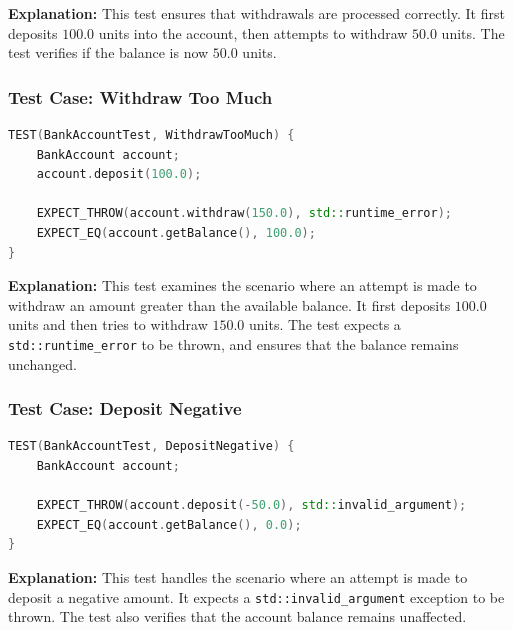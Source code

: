\textbf{Explanation:} This test ensures that withdrawals are processed correctly. It first deposits $100.0$ units into the account, then attempts to withdraw $50.0$ units. The test verifies if the balance is now $50.0$ units.

\subsubsection*{Test Case: Withdraw Too Much}
\begin{lstlisting}[language=C++]
TEST(BankAccountTest, WithdrawTooMuch) {
    BankAccount account;
    account.deposit(100.0);

    EXPECT_THROW(account.withdraw(150.0), std::runtime_error);
    EXPECT_EQ(account.getBalance(), 100.0);
}
\end{lstlisting}

\textbf{Explanation:} This test examines the scenario where an attempt is made to withdraw an amount greater than the available balance. It first deposits $100.0$ units and then tries to withdraw $150.0$ units. The test expects a \texttt{std::runtime\_error} to be thrown, and ensures that the balance remains unchanged.

\subsubsection*{Test Case: Deposit Negative}
\begin{lstlisting}[language=C++]
TEST(BankAccountTest, DepositNegative) {
    BankAccount account;

    EXPECT_THROW(account.deposit(-50.0), std::invalid_argument);
    EXPECT_EQ(account.getBalance(), 0.0);
}
\end{lstlisting}

\textbf{Explanation:} This test handles the scenario where an attempt is made to deposit a negative amount. It expects a \texttt{std::invalid\_argument} exception to be thrown. The test also verifies that the account balance remains unaffected.
